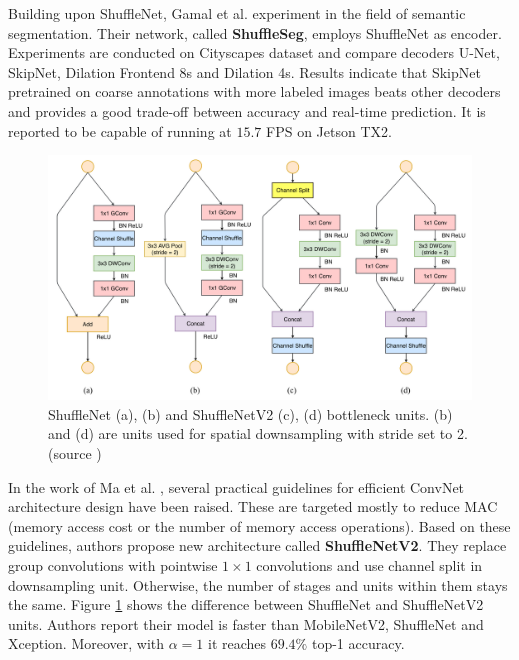 Building upon ShuffleNet, Gamal et al. \cite{bib:gamal2018shuffleseg} experiment in the field
of semantic segmentation. Their network, called \textbf{ShuffleSeg}, employs ShuffleNet as
encoder. Experiments are conducted on Cityscapes dataset
and compare decoders U-Net, SkipNet, Dilation Frontend 8s and Dilation 4s. Results indicate
that SkipNet pretrained on coarse annotations with more labeled images beats other decoders
and provides a good trade-off between accuracy and real-time prediction. It is reported
to be capable of running at $15.7$ FPS on Jetson TX2.
\cite{bib:gamal2018shuffleseg, bib:Siam_2018_CVPR_Workshops}

\begin{figure}[!h]
	\centerline{\includegraphics[width=1.0\textwidth]{images/shufflenetunits.png}}
	\caption[ShuffleNet and ShuffleNetV2 bottleneck units]{ShuffleNet (a), (b) and ShuffleNetV2 (c), (d) bottleneck units. (b) and (d) are units used for spatial downsampling with stride
	set to 2. (source \cite{bib:ma2018shufflenet})}
	\label{img:shufflenetunits}
\end{figure}

In the work of Ma et al. \cite{bib:ma2018shufflenet}, several practical guidelines
for efficient ConvNet architecture design have been raised. These are targeted mostly
to reduce MAC (memory access cost or the number of memory access operations).
Based on these guidelines, authors propose new architecture
called \textbf{ShuffleNetV2}. They replace group convolutions with pointwise $1\times 1$
convolutions and use channel split in downsampling unit. Otherwise, the number of stages and
units within them stays the same. Figure \ref{img:shufflenetunits} shows the difference between
ShuffleNet and ShuffleNetV2 units. Authors report their model is faster than MobileNetV2,
ShuffleNet and Xception. Moreover, with $\alpha=1$ it reaches $69.4\%$ top-1 accuracy.

